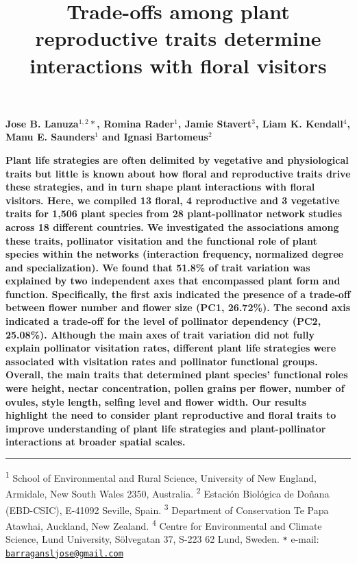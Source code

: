 \documentclass[12pt,a4paper,]{article}
\title{\singlespacing \vspace{-1.5cm} \LARGE Trade-offs among plant
reproductive traits determine interactions with floral visitors}
\author{}
\date{\vspace{-2.5em}}
\begin{document}
\maketitle

\vspace{-2.2cm} \singlespacing
\large 
\textbf{Jose B. Lanuza$^{1,2}*$, Romina Rader$^{1}$, Jamie Stavert$^{3}$, Liam K. Kendall$^{4}$, Manu E. Saunders$^{1}$ and Ignasi Bartomeus$^{2}$}

\normalsize

\textbf{Plant life strategies are often delimited by vegetative and
physiological traits but little is known about how floral and
reproductive traits drive these strategies, and in turn shape plant
interactions with floral visitors. Here, we compiled 13 floral, 4
reproductive and 3 vegetative traits for 1,506 plant species from 28
plant-pollinator network studies across 18 different countries. We
investigated the associations among these traits, pollinator visitation
and the functional role of plant species within the networks
(interaction frequency, normalized degree and specialization). We found
that 51.8\% of trait variation was explained by two independent axes
that encompassed plant form and function. Specifically, the first axis
indicated the presence of a trade-off between flower number and flower
size (PC1, 26.72\%). The second axis indicated a trade-off for the level
of pollinator dependency (PC2, 25.08\%). Although the main axes of trait
variation did not fully explain pollinator visitation rates, different
plant life strategies were associated with visitation rates and
pollinator functional groups. Overall, the main traits that determined
plant species' functional roles were height, nectar concentration,
pollen grains per flower, number of ovules, style length, selfing level
and flower width. Our results highlight the need to consider plant
reproductive and floral traits to improve understanding of plant life
strategies and plant-pollinator interactions at broader spatial scales.}

\small
\vspace{-0.5cm}

\noindent\rule{\textwidth}{1pt}

\textsuperscript{1} School of Environmental and Rural Science,
University of New England, Armidale, New South Wales 2350, Australia.
\textsuperscript{2} Estación Biológica de Doñana (EBD-CSIC), E-41092
Seville, Spain. \textsuperscript{3} Department of Conservation
\textbar{} Te Papa Atawhai, Auckland, New Zealand. \textsuperscript{4}
Centre for Environmental and Climate Science, Lund University,
Sölvegatan 37, S-223 62 Lund, Sweden. \texttt{*} e-mail:
\href{mailto:barragansljose@gmail.com}{\nolinkurl{barragansljose@gmail.com}}
\end{document}
